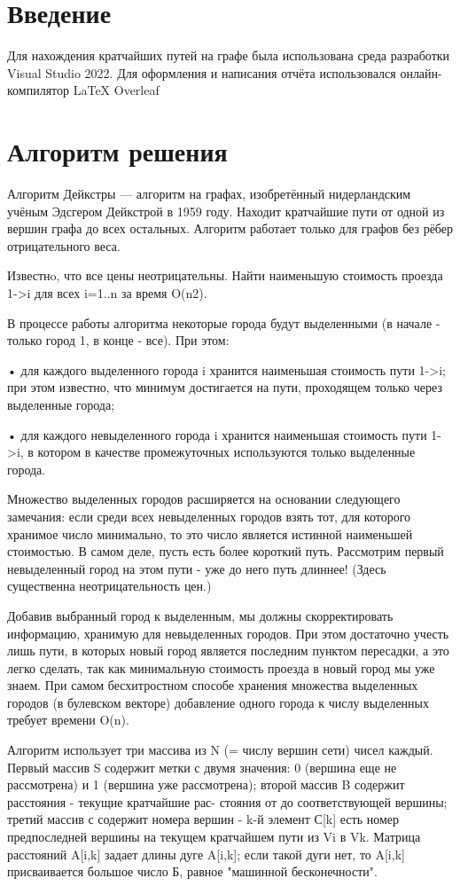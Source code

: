 \documentclass[14pt,a4paper]{scrartcl}
\begin{document}
\tableofcontents
\newpage
\section{Введение}
Для нахождения кратчайших путей на графе была использована среда разработки Visual Studio 2022. Для оформления и написания отчёта использовался онлайн-компилятор LaTeX Overleaf


\newpage
\section{Алгоритм решения}
Алгоритм Дейкстры — алгоритм на графах, изобретённый нидерландским учёным Эдсгером Дейкстрой в 1959 году. Находит кратчайшие пути от одной из вершин графа до всех остальных. Алгоритм работает только для графов без рёбер отрицательного веса.

Известнo, что все цены неотрицательны. Найти наименьшую стоимость проезда 1->i для всех i=1..n за время O(n2).

В процессе работы алгоритма некоторые города будут выделенными (в начале - только город 1, в конце - все). При этом:

•	для каждого выделенного города i хранится наименьшая стоимость пути 1->i; при этом известно, что минимум достигается на пути, проходящем только через выделенные города;

•	для каждого невыделенного города i хранится наименьшая стоимость пути 1->i, в котором в качестве промежуточных используются только выделенные города.

Множество выделенных городов расширяется на основании следующего замечания: если среди всех невыделенных городов взять тот, для которого хранимое число минимально, то это число является истинной наименьшей стоимостью. В самом деле, пусть есть более короткий путь. Рассмотрим первый невыделенный город на этом пути - уже до него путь длиннее! (Здесь существенна неотрицательность цен.)

Добавив выбранный город к выделенным, мы должны скорректировать информацию, хранимую для невыделенных городов. При этом достаточно учесть лишь пути, в которых новый город является последним пунктом пересадки, а это легко сделать, так как минимальную стоимость проезда в новый город мы уже знаем.
При самом бесхитростном способе хранения множества выделенных городов (в булевском векторе) добавление одного города к числу выделенных требует времени O(n).

Алгоритм использует три массива из N (= числу вершин сети) чисел каждый. Первый массив S содержит метки с двумя значения: 0 (вершина еще не рассмотрена) и 1 (вершина уже рассмотрена); второй массив B содержит расстояния - текущие кратчайшие рас- стояния от до соответствующей вершины; третий массив с содержит номера вершин - k-й элемент С[k] есть номер предпоследней вершины на текущем кратчайшем пути из Vi в Vk. Матрица расстояний A[i,k] задает длины дуге A[i,k]; если такой дуги нет, то A[i,k] присваивается большое число Б, равное "машинной бесконечности".
\end{document}
